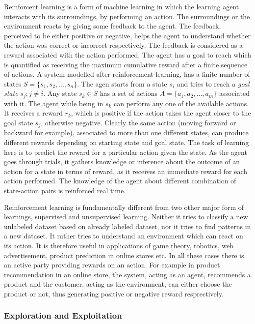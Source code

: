 \documentclass[english]{tktltiki}
\begin{document}
Reinforcent learning \cite{reinforcement_learning} is a form of machine learning in which the learning agent interacts with its surroundings, by performing an action. The surroundings or the environment reacts by giving some feedback to the agent. The feedback, perceived to be either positive or negative, helps the agent to understand whether the action was correct or incorrect respectively. The feedback is considered as a reward associated with the action performed. The agent has a goal to reach which is quantified as receiving the maximum cumulative reward after a finite sequence of actions. A system modelled after reinforcement learning, has a finite number of states $S = \{s_1, s_2, ..., s_n\}$. The agen starts from a state $s_i$ and tries to reach a \textit{goal state} $s_j; j \neq i$. Any state $s_k \in S$ has a set of actions $A = \{a_1, a_2, ..., a_m\}$ associated with it. The agent while being in $s_k$ can perform any one of the available actions. It receives a reward $r_k$, which is positive if the action takes the agent closer to the goal state $s_j$, otherwise negative. Clearly the same action (moving forward or backward for example), associated to more than one different states, can produce different rewards depending on starting state and goal state. The task of learning here is to predict the reward for a particular action given the state. As the agent goes through trials, it gathers knowledge or inference about the outcome of an action for a state in terms of reward, as it receives an immediate reward for each action performed. The knowledge of the agent about different combination of state-action pairs is reinforced real time.

Reinforcement learning is fundamentally different from two other major form of learnings, supervised and unsupervised learning. Neither it tries to classify a new unlabeled dataset based on already labeled dataset, nor it tries to find patterns in a new dataset. It rather tries to understand an environment which can react on its action. It is therefore useful in applications of game theory, robotics, web advertisement, product prediction in online stores etc. In all these cases there is an active party providing rewards on an action. For example in product recommendation in an online store, the system, acting as an agent, recommends a product and the customer, acting as the environment, can either choose the product or not, thus generating positive or negative reward resprectively.

\subsubsection{Exploration and Exploitation}
\end{document}
